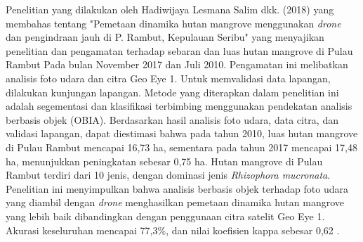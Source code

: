 Penelitian yang dilakukan oleh Hadiwijaya Lesmana Salim dkk. (2018) yang membahas tentang "Pemetaan dinamika hutan mangrove menggunakan \textit{drone} dan pengindraan jauh di P. Rambut, Kepulauan Seribu" yang menyajikan penelitian dan pengamatan terhadap sebaran dan luas hutan mangrove di Pulau Rambut Pada bulan November 2017 dan Juli 2010. Pengamatan ini melibatkan analisis foto udara dan citra Geo Eye 1. Untuk memvalidasi data lapangan, dilakukan kunjungan lapangan. Metode yang diterapkan dalam penelitian ini adalah segementasi dan klasifikasi terbimbing menggunakan pendekatan analisis berbasis objek (OBIA). Berdasarkan hasil analisis foto udara, data citra, dan validasi lapangan, dapat diestimasi bahwa pada tahun 2010, luas hutan mangrove di Pulau Rambut mencapai 16,73 ha, sementara pada tahun 2017 mencapai 17,48 ha, menunjukkan peningkatan sebesar 0,75 ha. Hutan mangrove di Pulau Rambut terdiri dari 10 jenis, dengan dominasi jenis \textit{Rhizophora mucronata}. Penelitian ini menyimpulkan bahwa analisis berbasis objek terhadap foto udara yang diambil dengan \textit{drone} menghasilkan pemetaan dinamika hutan mangrove yang lebih baik dibandingkan dengan penggunaan citra satelit Geo Eye 1. Akurasi keseluruhan mencapai 77,3\%, dan nilai koefisien kappa sebesar 0,62 \citep{islands2018pemetaan}.

